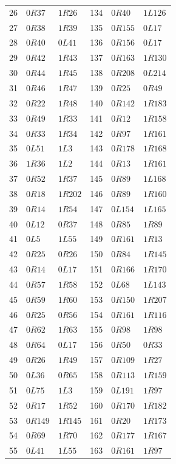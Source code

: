 \begin{longtable}{rll@{\qquad}rll}
26 & $0R37$ & $1R26$ & 134 & $0R40$ & $1L126$\\
27 & $0R38$ & $1R39$ & 135 & $0R155$ & $0L17$\\
28 & $0R40$ & $0L41$ & 136 & $0R156$ & $0L17$\\
29 & $0R42$ & $1R43$ & 137 & $0R163$ & $1R130$\\
30 & $0R44$ & $1R45$ & 138 & $0R208$ & $0L214$\\
31 & $0R46$ & $1R47$ & 139 & $0R25$ & $0R49$\\
32 & $0R22$ & $1R48$ & 140 & $0R142$ & $1R183$\\
33 & $0R49$ & $1R33$ & 141 & $0R12$ & $1R158$\\
34 & $0R33$ & $1R34$ & 142 & $0R97$ & $1R161$\\
35 & $0L51$ & $1L3$ & 143 & $0R178$ & $1R168$\\
36 & $1R36$ & $1L2$ & 144 & $0R13$ & $1R161$\\
37 & $0R52$ & $1R37$ & 145 & $0R89$ & $1L168$\\
38 & $0R18$ & $1R202$ & 146 & $0R89$ & $1R160$\\
39 & $0R14$ & $1R54$ & 147 & $0L154$ & $1L165$\\
40 & $0L12$ & $0R37$ & 148 & $0R85$ & $1R89$\\
41 & $0L5$ & $1L55$ & 149 & $0R161$ & $1R13$\\
42 & $0R25$ & $0R26$ & 150 & $0R84$ & $1R145$\\
43 & $0R14$ & $0L17$ & 151 & $0R166$ & $1R170$\\
44 & $0R57$ & $1R58$ & 152 & $0L68$ & $1L143$\\
45 & $0R59$ & $1R60$ & 153 & $0R150$ & $1R207$\\
46 & $0R25$ & $0R56$ & 154 & $0R161$ & $1R116$\\
47 & $0R62$ & $1R63$ & 155 & $0R98$ & $1R98$\\
48 & $0R64$ & $0L17$ & 156 & $0R50$ & $0R33$\\
49 & $0R26$ & $1R49$ & 157 & $0R109$ & $1R27$\\
50 & $0L36$ & $0R65$ & 158 & $0R113$ & $1R159$\\
51 & $0L75$ & $1L3$ & 159 & $0L191$ & $1R97$\\
52 & $0R17$ & $1R52$ & 160 & $0R170$ & $1R182$\\
53 & $0R149$ & $1R145$ & 161 & $0R20$ & $1R173$\\
54 & $0R69$ & $1R70$ & 162 & $0R177$ & $1R167$\\
55 & $0L41$ & $1L55$ & 163 & $0R161$ & $1R97$\\

\end{longtable}
